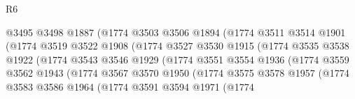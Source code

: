 \begin{lexlean}{R6}
\begin{coremodule}
                                @3495
                                @3498
                                @1887
                                (@1774
                                  @3503
                                  @3506
                                  @1894
                                  (@1774
                                    @3511
                                    @3514
                                    @1901
                                    (@1774
                                      @3519
                                      @3522
                                      @1908
                                      (@1774
                                        @3527
                                        @3530
                                        @1915
                                        (@1774
                                          @3535
                                          @3538
                                          @1922
                                          (@1774
                                            @3543
                                            @3546
                                            @1929
                                            (@1774
                                              @3551
                                              @3554
                                              @1936
                                              (@1774
                                                @3559
                                                @3562
                                                @1943
                                                (@1774
                                                  @3567
                                                  @3570
                                                  @1950
                                                  (@1774
                                                    @3575
                                                    @3578
                                                    @1957
                                                    (@1774
                                                      @3583
                                                      @3586
                                                      @1964
                                                      (@1774
                                                        @3591
                                                        @3594
                                                        @1971
                                                        (@1774

\end{coremodule}
\end{lexlean}
